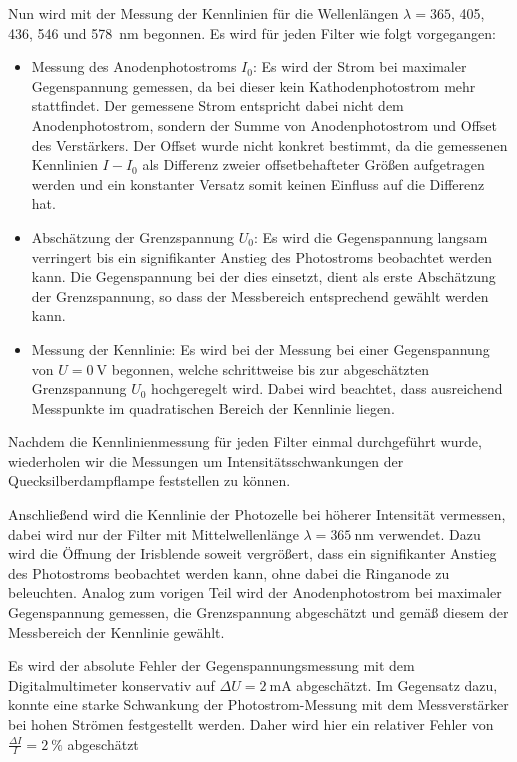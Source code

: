 \documentclass[11pt, a4paper]{article}
\numberwithin{equation}{section}
\begin{document}
Nun wird mit der Messung der Kennlinien für die Wellenlängen $\lambda = \num{365}$, \num{405}, \num{436}, \num{546} und \SI{578}{\nano\metre} begonnen.
Es wird für jeden Filter wie folgt vorgegangen:
\begin{itemize}
  \item Messung des Anodenphotostroms $I_0$: Es wird der Strom bei maximaler Gegenspannung gemessen, da bei dieser kein Kathodenphotostrom mehr stattfindet.
  Der gemessene Strom entspricht dabei nicht dem Anodenphotostrom, sondern der Summe von Anodenphotostrom und Offset des Verstärkers.
  Der Offset wurde nicht konkret bestimmt, da die gemessenen Kennlinien $I-I_0$ als Differenz zweier offsetbehafteter Größen aufgetragen werden und ein konstanter Versatz somit keinen Einfluss auf die Differenz hat. 
  \item Abschätzung der Grenzspannung $U_0$: Es wird die Gegenspannung langsam verringert bis ein signifikanter Anstieg des Photostroms beobachtet werden kann.
  Die Gegenspannung bei der dies einsetzt, dient als erste Abschätzung der Grenzspannung, so dass der Messbereich entsprechend gewählt werden kann.
  \item Messung der Kennlinie: Es wird bei der Messung bei einer Gegenspannung von $U = \SI{0}{\volt}$ begonnen, welche schrittweise bis zur abgeschätzten Grenzspannung $U_0$ hochgeregelt wird. Dabei wird beachtet, dass ausreichend Messpunkte im quadratischen Bereich der Kennlinie liegen.
\end{itemize}
Nachdem die Kennlinienmessung für jeden Filter einmal durchgeführt wurde, wiederholen wir die Messungen um Intensitätsschwankungen der Quecksilberdampflampe feststellen zu können.

Anschließend wird die Kennlinie der Photozelle bei höherer Intensität vermessen, dabei wird nur der Filter mit Mittelwellenlänge $\lambda = \SI{365}{\nano\metre}$ verwendet.
Dazu wird die Öffnung der Irisblende soweit vergrößert, dass ein signifikanter Anstieg des Photostroms beobachtet werden kann, ohne dabei die Ringanode zu beleuchten.
Analog zum vorigen Teil wird der Anodenphotostrom bei maximaler Gegenspannung gemessen, die Grenzspannung abgeschätzt und gemäß diesem der Messbereich der Kennlinie gewählt.

Es wird der absolute Fehler der Gegenspannungsmessung mit dem Digitalmultimeter konservativ auf $\Delta U = \SI{2}{\milli\ampere}$ abgeschätzt.
Im Gegensatz dazu, konnte eine starke Schwankung der Photostrom-Messung mit dem Messverstärker bei hohen Strömen festgestellt werden.
Daher wird hier ein relativer Fehler von $\frac{\Delta I}{I} = \SI{2}{\percent}$ abgeschätzt
\end{document}
